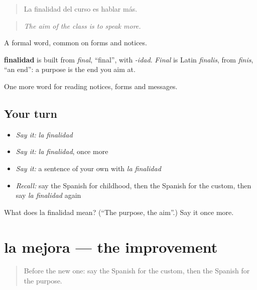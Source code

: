\begin{quote}
La finalidad del curso es hablar más.
\end{quote}

\begin{quote}
\emph{The aim of the class is to speak more.}
\end{quote}

A formal word, common on forms and notices.

\begin{cousinweb}
\textbf{finalidad} is built from \emph{final}, \textquotedblleft{}final\textquotedblright{}, with \emph{-idad}. \emph{Final} is Latin \emph{finalis}, from \emph{finis}, \textquotedblleft{}an end\textquotedblright{}: a purpose is the end you aim at.
\end{cousinweb}

\begin{grammarlens}[title={What you've built}]
One more word for reading notices, forms and messages.
\end{grammarlens}

\subsection*{Your turn}
\begin{itemize}
\raggedright
  \item \emph{Say it:} \emph{la finalidad}
  \item \emph{Say it:} \emph{la finalidad}, once more
  \item \emph{Say it:} a sentence of your own with \emph{la finalidad}
  \item \emph{Recall:} say the Spanish for childhood, then the Spanish for the custom, then say \emph{la finalidad} again
\end{itemize}

\begin{tcolorbox}[breakable,colback=teal!4,colframe=teal!35!black,title={Before you move on}]
What does la finalidad mean? (\textquotedblleft{}The purpose, the aim\textquotedblright{}.) Say it once more.
\end{tcolorbox}
\section[la mejora]{la mejora — the improvement}

\label{lesson:ES-C483-mejora}



\begin{quote}
Before the new one: say the Spanish for the custom, then the Spanish for the purpose.
\end{quote}

